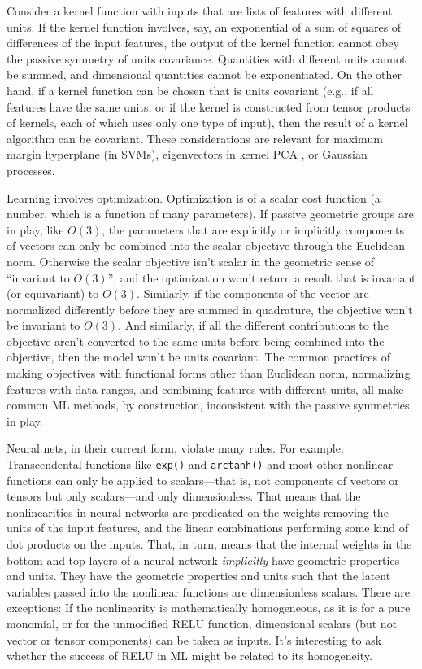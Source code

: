 \documentclass{article}
\theoremstyle{plain}
\theoremstyle{definition}
\theoremstyle{remark}
\begin{document}
Consider a kernel function with inputs that are lists of features with different units.
If the kernel function involves, say, an exponential of a sum of squares of differences of the input features, the output of the kernel function cannot obey the passive symmetry of units covariance.
Quantities with different units cannot be summed, and dimensional quantities cannot be exponentiated. 
On the other hand, if a kernel function can be chosen that is units covariant (e.g., if all features have the same units, or if the kernel is constructed from tensor products of kernels, each of which uses only one type of input), then the result of a kernel algorithm can be covariant. These considerations are relevant for maximum margin hyperplane (in SVMs), eigenvectors in kernel PCA \cite{SchSmo02}, or Gaussian processes.

Learning involves optimization.
Optimization is of a scalar cost function (a number, which is a function of many parameters).
If passive geometric groups are in play, like $O(3)$, the parameters that are explicitly or implicitly components of vectors can only be combined into the scalar objective through the Euclidean norm.
Otherwise the scalar objective isn't scalar in the geometric sense of ``invariant to $O(3)$'', and the optimization won't return a result that is invariant (or equivariant) to $O(3)$.
Similarly, if the components of the vector are normalized differently before they are summed in quadrature, the objective won't be invariant to $O(3)$.
And similarly, if all the different contributions to the objective aren't converted to the same units before being combined into the objective, then the model won't be units covariant.
The common practices of making objectives with functional forms other than Euclidean norm, normalizing features with data ranges, and combining features with different units, all make common ML methods, by construction, inconsistent with the passive symmetries in play.

Neural nets, in their current form, violate many rules. For example:
Transcendental functions like \texttt{exp()} and \texttt{arctanh()} and most other nonlinear functions can only be applied to scalars---that is, not components of vectors or tensors but only scalars---and only dimensionless.
That means that the nonlinearities in neural networks are predicated on the weights removing the units of the input features, and the linear combinations performing some kind of dot products on the inputs.
That, in turn, means that the internal weights in the bottom and top layers of a neural network \emph{implicitly} have geometric properties and units.
They have the geometric properties and units such that the latent variables passed into the nonlinear functions are dimensionless scalars.
There are exceptions:
If the nonlinearity is mathematically homogeneous, as it is for a pure monomial, or for the unmodified RELU function, dimensional scalars (but not vector or tensor components) can be taken as inputs.
It's interesting to ask whether the success of RELU in ML might be related to its homogeneity.
\end{document}
